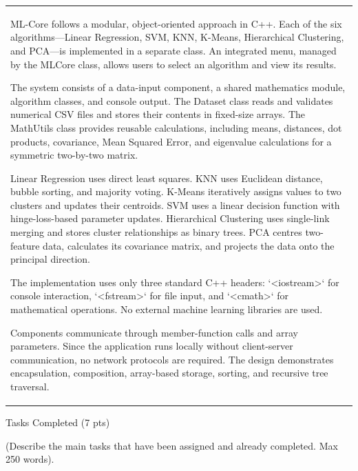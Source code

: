 \documentclass[12pt,a4paper]{article}
\newcommand{\sectiontitle}[1]{%
    {\color{GEUBlue}
    \fontsize{18}{22}\selectfont #1}
}
\newcommand{\instruction}[1]{%
    {\color{InstructionGrey}
    \fontsize{10.5}{13}\selectfont #1}
}
\newcommand{\answerbox}[2]{%
    \begin{tabularx}{\textwidth}{
        |>{\raggedright\arraybackslash}X|}
        \hline
        \parbox[t][#1][t]{\dimexpr\linewidth-12pt\relax}{
            \vspace{5pt}
            \fontsize{11}{13}\selectfont #2
        }\\
        \hline
    \end{tabularx}
}
\begin{document}
\answerbox{8cm}{ML-Core follows a modular, object-oriented approach in C++. Each of the six algorithms—Linear Regression, SVM, KNN, K-Means, Hierarchical Clustering, and PCA—is implemented in a separate class. An integrated menu, managed by the MLCore class, allows users to select an algorithm and view its results.

The system consists of a data-input component, a shared mathematics module, algorithm classes, and console output. The Dataset class reads and validates numerical CSV files and stores their contents in fixed-size arrays. The MathUtils class provides reusable calculations, including means, distances, dot products, covariance, Mean Squared Error, and eigenvalue calculations for a symmetric two-by-two matrix.

Linear Regression uses direct least squares. KNN uses Euclidean distance, bubble sorting, and majority voting. K-Means iteratively assigns values to two clusters and updates their centroids. SVM uses a linear decision function with hinge-loss-based parameter updates. Hierarchical Clustering uses single-link merging and stores cluster relationships as binary trees. PCA centres two-feature data, calculates its covariance matrix, and projects the data onto the principal direction.

The implementation uses only three standard C++ headers: `<iostream>` for console interaction, `<fstream>` for file input, and `<cmath>` for mathematical operations. No external machine learning libraries are used.

Components communicate through member-function calls and array parameters. Since the application runs locally without client-server communication, no network protocols are required. The design demonstrates encapsulation, composition, array-based storage, sorting, and recursive tree traversal.}

\newpage


\vspace*{0.20cm}

\sectiontitle{Tasks Completed (7 pts)}

\vspace{0.05cm}

\instruction{
(Describe the main tasks that have been assigned and already completed.
Max 250 words).
}

\vspace{0.20cm}
\end{document}
